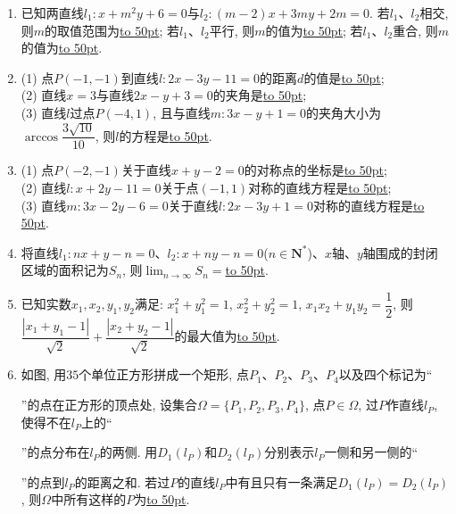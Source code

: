 \documentclass[10pt,a4paper]{article}
\newcommand{\blank}[1]{\underline{\hbox to #1pt{}}}
\begin{document}
\begin{enumerate}[1.]
(1) 过点$(1,-1)$, 且倾斜角为$\alpha=\pi-\arctan\dfrac 12$:\blank{50};\\
(2) 过点$(2,3)$与$(-1,-2)$:\blank{50};\\
(3) 过点$(2,3)$、方向向量为$\overrightarrow d=(4,7)$的直线方程是\blank{50};\\
(4) 过点$(2,3)$、法向量$\overrightarrow{n}=(8,9)$的直线方程是\blank{50};\\
(5) 已知直线$l$过直线$l_1:3x-5y-10=0$和$l_2:x+y+1=0$的交点, 且平行于$l_3:x+2y-5=0$, 则直线$l$的方程为\blank{50}.
\item 已知两直线$l_1:x+m^2y+6=0$与$l_2:(m-2)x+3my+2m=0$. 若$l_1$、$l_2$相交, 则$m$的取值范围为\blank{50}; 若$l_1$、$l_2$平行, 则$m$的值为\blank{50}; 若$l_1$、$l_2$重合, 则$m$的值为\blank{50}.
\item (1) 点$P(-1,-1)$到直线$l:2x-3y-11=0$的距离$d$的值是\blank{50};\\
(2) 直线$x=3$与直线$2x-y+3=0$的夹角是\blank{50};\\
(3) 直线$l$过点$P(-4,1)$, 且与直线$m:3x-y+1=0$的夹角大小为$\arccos\dfrac{3\sqrt{10}}{10}$, 则$l$的方程是\blank{50}.
\item (1) 点$P(-2,-1)$关于直线$x+y-2=0$的对称点的坐标是\blank{50};\\
(2) 直线$l:x+2y-11=0$关于点$(-1,1)$对称的直线方程是\blank{50};\\
(3) 直线$m:3x-2y-6=0$关于直线$l:2x-3y+1=0$对称的直线方程是\blank{50}.
\item 将直线$l_1:nx+y-n=0$、$l_2:x+ny-n=0$($n\in \mathbf{N}^*$)、$x$轴、$y$轴围成的封闭区域的面积记为$S_n$, 则$\displaystyle\lim_{n\to \infty}S_n=$\blank{50}.
\item 已知实数$x_1,x_2,y_1,y_2$满足: $x_1^2+y_1^2=1$, $x_2^2+y_2^2=1$, $x_1x_2+y_1y_2=\dfrac 12$, 则$\dfrac{|x_1+y_1-1|}{\sqrt 2}+\dfrac{|x_2+y_2-1|}{\sqrt 2}$的最大值为\blank{50}.
\item 如图, 用$35$个单位正方形拼成一个矩形, 点$P_1$、$P_2$、$P_3$、$P_4$以及四个标记为``''的点在正方形的顶点处, 设集合$\Omega =\{P_1,P_2,P_3,P_4\}$, 点$P\in \Omega$, 过$P$作直线$l_P$, 使得不在$l_P$上的``''的点分布在$l_P$的两侧. 用$D_1(l_P)$和$D_2(l_P)$分别表示$l_P$一侧和另一侧的``''的点到$l_P$的距离之和. 若过$P$的直线$l_P$中有且只有一条满足$D_1(l_P)=D_2(l_P)$, 则$\Omega$中所有这样的$P$为\blank{50}.

\end{enumerate}
\end{document}

